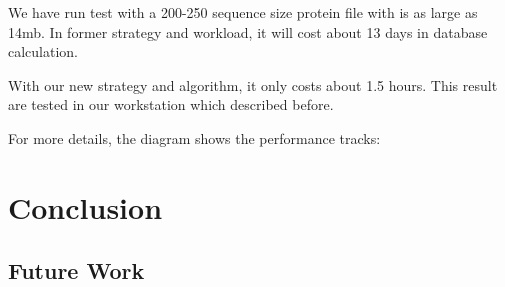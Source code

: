 \documentclass[letterpaper,twocolumn,10pt]{article}
\begin{document}
We have run test with a 200-250 sequence size protein file with is as large as 14mb. In former strategy and workload, it will cost about 13 days in database calculation. 

With our new strategy and algorithm, it only costs about 1.5 hours. This result are tested in our workstation which described before. 

For more details, the diagram shows the performance tracks:

\section{Conclusion}

\subsection{Future Work}


\theendnotes
\end{document}
